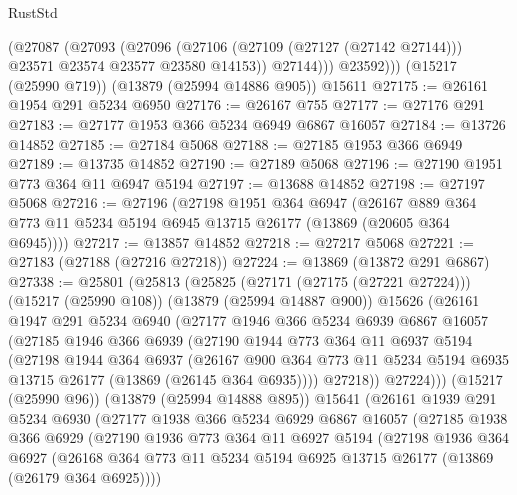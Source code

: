 \begin{lexlean}{RustStd}
\begin{coremodule}
            (@27087
              (@27093
                (@27096
                  (@27106 (@27109 (@27127 (@27142 @27144))) @23571 @23574 @23577 @23580 @14153))
                @27144)))
          @23592)))
    (@15217 (@25990 @719))
    (@13879 (@25994 @14886 @905))
    @15611
@27175 := @26161 @1954 @291 @5234 @6950
@27176 := @26167 @755
@27177 := @27176 @291
@27183 := @27177 @1953 @366 @5234 @6949 @6867 @16057
@27184 := @13726 @14852
@27185 := @27184 @5068
@27188 := @27185 @1953 @366 @6949
@27189 := @13735 @14852
@27190 := @27189 @5068
@27196 := @27190 @1951 @773 @364 @11 @6947 @5194
@27197 := @13688 @14852
@27198 := @27197 @5068
@27216 := @27196
    (@27198
      @1951
      @364
      @6947
      (@26167 @889 @364 @773 @11 @5234 @5194 @6945 @13715 @26177 (@13869 (@20605 @364 @6945))))
@27217 := @13857 @14852
@27218 := @27217 @5068
@27221 := @27183 (@27188 (@27216 @27218))
@27224 := @13869 (@13872 @291 @6867)
@27338 := @25801
    (@25813
      (@25825
        (@27171 (@27175 (@27221 @27224)))
        (@15217 (@25990 @108))
        (@13879 (@25994 @14887 @900))
        @15626
        (@26161
          @1947
          @291
          @5234
          @6940
          (@27177
            @1946
            @366
            @5234
            @6939
            @6867
            @16057
            (@27185
              @1946
              @366
              @6939
              (@27190
                @1944
                @773
                @364
                @11
                @6937
                @5194
                (@27198
                  @1944
                  @364
                  @6937
                  (@26167
                    @900
                    @364
                    @773
                    @11
                    @5234
                    @5194
                    @6935
                    @13715
                    @26177
                    (@13869 (@26145 @364 @6935))))
                @27218))
            @27224)))
      (@15217 (@25990 @96))
      (@13879 (@25994 @14888 @895))
      @15641
      (@26161
        @1939
        @291
        @5234
        @6930
        (@27177
          @1938
          @366
          @5234
          @6929
          @6867
          @16057
          (@27185
            @1938
            @366
            @6929
            (@27190
              @1936
              @773
              @364
              @11
              @6927
              @5194
              (@27198
                @1936
                @364
                @6927
                (@26168 @364 @773 @11 @5234 @5194 @6925 @13715 @26177 (@13869 (@26179 @364 @6925))))

\end{coremodule}
\end{lexlean}
